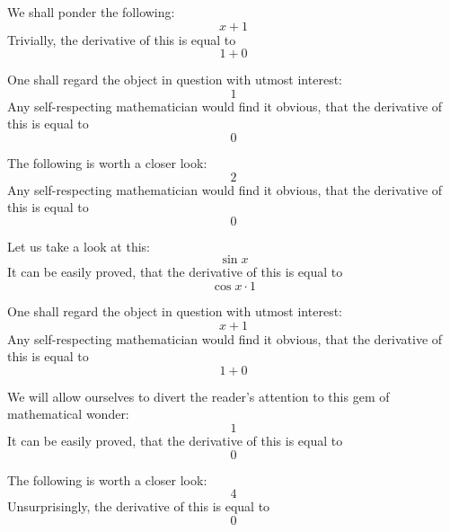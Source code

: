 \documentclass{article}
\begin{document}
We shall ponder the following:
\begin{equation}
x + 1 
\end{equation}
Trivially, the derivative of this is equal to
\begin{equation}
1 + 0 
\end{equation}

One shall regard the object in question with utmost interest:
\begin{equation}
1 
\end{equation}
Any self-respecting mathematician would find it obvious, that the derivative of this is equal to
\begin{equation}
0 
\end{equation}

The following is worth a closer look:
\begin{equation}
2 
\end{equation}
Any self-respecting mathematician would find it obvious, that the derivative of this is equal to
\begin{equation}
0 
\end{equation}

Let us take a look at this:
\begin{equation}
\sin x 
\end{equation}
It can be easily proved, that the derivative of this is equal to
\begin{equation}
\cos x \cdot 1 
\end{equation}

One shall regard the object in question with utmost interest:
\begin{equation}
x + 1 
\end{equation}
Any self-respecting mathematician would find it obvious, that the derivative of this is equal to
\begin{equation}
1 + 0 
\end{equation}

We will allow ourselves to divert the reader's attention to this gem of mathematical wonder:
\begin{equation}
1 
\end{equation}
It can be easily proved, that the derivative of this is equal to
\begin{equation}
0 
\end{equation}

The following is worth a closer look:
\begin{equation}
4 
\end{equation}
Unsurprisingly, the derivative of this is equal to
\begin{equation}
0 
\end{equation}
\end{document}
